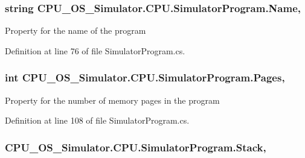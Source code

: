 \subsubsection[{Name}]{\setlength{\rightskip}{0pt plus 5cm}string C\+P\+U\+\_\+\+O\+S\+\_\+\+Simulator.\+C\+P\+U.\+Simulator\+Program.\+Name\hspace{0.3cm}{\ttfamily [get]}, {\ttfamily [set]}}\label{class_c_p_u___o_s___simulator_1_1_c_p_u_1_1_simulator_program_a29b077a3403773010be9efe912d11b92}


Property for the name of the program 



Definition at line 76 of file Simulator\+Program.\+cs.

\hypertarget{class_c_p_u___o_s___simulator_1_1_c_p_u_1_1_simulator_program_aa33b4428956a097dd710948ee51bb5f3}{}
\subsubsection[{Pages}]{\setlength{\rightskip}{0pt plus 5cm}int C\+P\+U\+\_\+\+O\+S\+\_\+\+Simulator.\+C\+P\+U.\+Simulator\+Program.\+Pages\hspace{0.3cm}{\ttfamily [get]}, {\ttfamily [set]}}\label{class_c_p_u___o_s___simulator_1_1_c_p_u_1_1_simulator_program_aa33b4428956a097dd710948ee51bb5f3}


Property for the number of memory pages in the program 



Definition at line 108 of file Simulator\+Program.\+cs.

\hypertarget{class_c_p_u___o_s___simulator_1_1_c_p_u_1_1_simulator_program_ac6065e57e8d108a0aefd27840f3bf01c}{}
\subsubsection[{Stack}]{ C\+P\+U\+\_\+\+O\+S\+\_\+\+Simulator.\+C\+P\+U.\+Simulator\+Program.\+Stack\hspace{0.3cm}{\ttfamily [get]}, {\ttfamily [set]}}\label{class_c_p_u___o_s___simulator_1_1_c_p_u_1_1_simulator_program_ac6065e57e8d108a0aefd27840f3bf01c}


